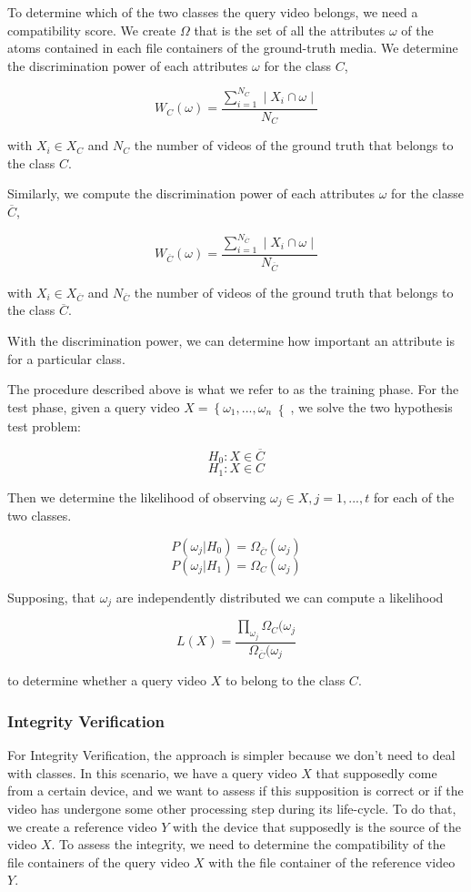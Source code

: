 To determine which of the two classes the query video belongs, we need a compatibility score. We create $\Omega$ that is the set of all the attributes $\omega$ of the atoms contained in each file containers of the ground-truth media. We determine the discrimination power of each attributes $\omega$ for the class $C$,

$$  W_{C}(\omega) = \dfrac{\sum\limits_{i=1}^{N_{C}}\mid X_{i} \cap \omega \mid}{N_{C}} $$

with $X_{i} \in X_{C}$ and $N_{C}$ the number of videos of the ground truth that belongs to the class $C$.

Similarly, we compute the discrimination power of each attributes $\omega$ for the classe $\overline{C}$,

$$  W_{\overline{C}}(\omega) = \dfrac{\sum\limits_{i=1}^{N_{\overline{C}}}\mid X_{i} \cap \omega \mid}{N_{\overline{C}}} $$

with $X_{i} \in X_{\overline{C}}$ and $N_{\overline{C}}$ the number of videos of the ground truth that belongs to the class $\overline{C}$.

With the discrimination power, we can determine how important an attribute is for a particular class.

The procedure described above is what we refer to as the training phase. For the test phase, given a query video $X = \left\lbrace \omega_{1},...,\omega_{n} \right\lbrace $, we solve the two hypothesis test problem:

$$  H_{0}:X \in \overline{C} $$
$$  H_{1}:X \in C $$

Then we determine the likelihood of observing $\omega_{j} \in X, j = 1,...,t$ for each of the two classes.

$$ P(\omega_{j}\vert H_{0}) = \Omega_{\overline{C}}(\omega_{j}) $$
$$ P(\omega_{j}\vert H_{1}) = \Omega_{C}(\omega_{j}) $$ 

Supposing, that $\omega_{j}$ are independently distributed we can compute a likelihood

$$ L(X) = \dfrac{\prod\limits_{\omega_{j}} \Omega_{C}(\omega_{j} }{\Omega_{\overline{C}}(\omega_{j}} $$

to determine whether a query video $X$ to belong to the class $C$.

\subsubsection*{Integrity Verification}

For Integrity Verification, the approach is simpler because we don't need to deal with classes. In this scenario, we have a query video $X$ that supposedly come from a certain device, and we want to assess if this supposition is correct or if the video has undergone some other processing step during its life-cycle. To do that, we create a reference video $Y$ with the device that supposedly is the source of the video $X$. To assess the integrity, we need to determine the compatibility of the file containers of the query video $X$ with the file container of the reference video $Y$. 

